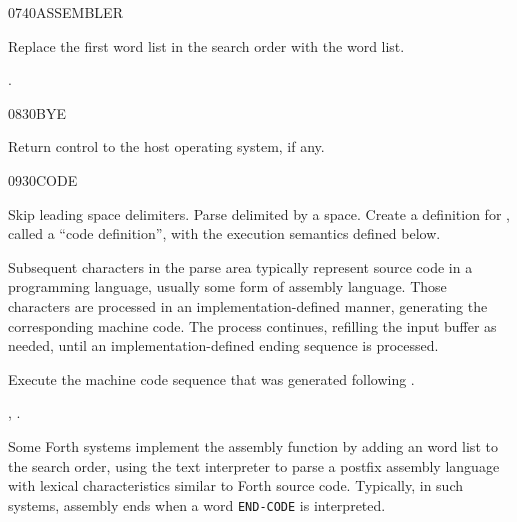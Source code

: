 \begin{worddef}{0740}{ASSEMBLER}
\item \stack{}{}

	Replace the first word list in the search order with the
	 word list.

\see {}.
\end{worddef}


\begin{worddef}{0830}{BYE}
\item \stack{}{}

	Return control to the host operating system, if any.
\end{worddef}


\begin{worddef}{0930}{CODE}
\item {}

	Skip leading space delimiters. Parse  delimited by a
	space. Create a definition for , called a ``code
	definition'', with the execution semantics defined below.

	Subsequent characters in the parse area typically represent
	source code in a programming language, usually some form of
	assembly language. Those characters are processed in an
	implementation-defined manner, generating the corresponding
	machine code. The process continues, refilling the input buffer
	as needed, until an implementation-defined ending sequence is
	processed.

\execute[name]

	Execute the machine code sequence that was generated following
	.

\see {},
	.

	\begin{rationale} %
		Some Forth systems implement the assembly function by adding
		an  word list to the search order,
		using the text interpreter to parse a postfix assembly
		language with lexical characteristics similar to Forth source
		code. Typically, in such systems, assembly ends when a word
		\texttt{END-CODE} is interpreted.
	\end{rationale}
\end{worddef}


